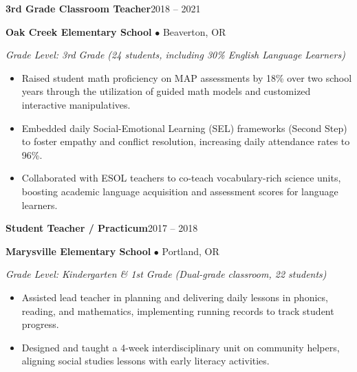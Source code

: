 \documentclass[10pt,letterpaper]{article}
\begin{document}
\begin{minipage}[t]{0.65\linewidth}
  {\raggedright\textbf{\large 3rd Grade Classroom Teacher}\hfill{\color{light}\small 2018 -- 2021}\par}%
  {\raggedright{\color{accent}\bfseries Oak Creek Elementary School} $\bullet$ {\color{light}\small Beaverton, OR}\par}%
  {\raggedright{\small\itshape Grade Level: 3rd Grade (24 students, including 30\% English Language Learners)}\par}%
  \begin{itemize}[leftmargin=*, noitemsep, topsep=3pt, parsep=2pt, itemsep=2pt]
    \item Raised student math proficiency on MAP assessments by 18\% over two school years through the utilization of guided math models and customized interactive manipulatives.
    \item Embedded daily Social-Emotional Learning (SEL) frameworks (Second Step) to foster empathy and conflict resolution, increasing daily attendance rates to 96\%.
    \item Collaborated with ESOL teachers to co-teach vocabulary-rich science units, boosting academic language acquisition and assessment scores for language learners.
  \end{itemize}
  \vspace{0.35cm}

  {\raggedright\textbf{\large Student Teacher / Practicum}\hfill{\color{light}\small 2017 -- 2018}\par}%
  {\raggedright{\color{accent}\bfseries Marysville Elementary School} $\bullet$ {\color{light}\small Portland, OR}\par}%
  {\raggedright{\small\itshape Grade Level: Kindergarten \& 1st Grade (Dual-grade classroom, 22 students)}\par}%
  \begin{itemize}[leftmargin=*, noitemsep, topsep=3pt, parsep=2pt, itemsep=2pt]
    \item Assisted lead teacher in planning and delivering daily lessons in phonics, reading, and mathematics, implementing running records to track student progress.
    \item Designed and taught a 4-week interdisciplinary unit on community helpers, aligning social studies lessons with early literacy activities.
  \end{itemize}
\end{minipage}
\end{document}
